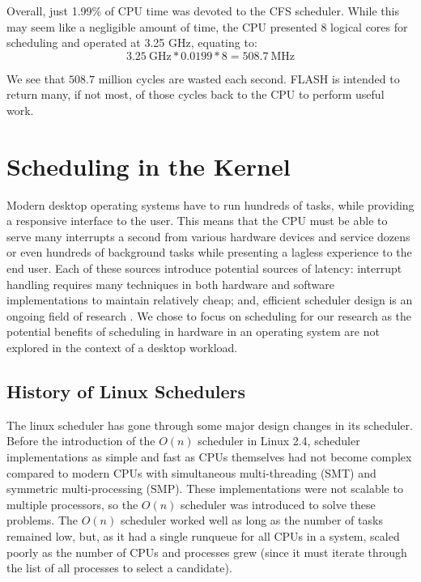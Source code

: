 \documentclass{sig-alternate-10pt}
\begin{document}
Overall, just 1.99\% of CPU time was devoted to the CFS scheduler. While this may seem like a negligible amount of time, the CPU presented 8 logical cores for scheduling and operated at 3.25 GHz, equating to:
\begin{equation*}
	3.25\ \text{GHz}*0.0199*8 = 508.7\ \text{MHz}
\end{equation*}

We see that $508.7$ million cycles are wasted each second. FLASH is intended
to return many, if not most, of those cycles back to the CPU to perform
useful work.

\section{Scheduling in the Kernel}
\label{sec:sched_in_kernel}
Modern desktop operating systems have to run hundreds of tasks, while providing a responsive interface to the user. This means that the CPU must be able to serve many interrupts a second from various hardware devices and service dozens or even hundreds of background tasks while presenting a lagless experience to the end user. Each of these sources introduce potential sources of latency: interrupt handling \cite{regehr2007safe} requires many techniques in both hardware and software implementations to maintain relatively cheap; and, efficient scheduler design is an ongoing field of research \cite{wong2008cfs, park2008hardware, morton2004hardware}. We chose to focus on scheduling for our research as the potential benefits of scheduling in hardware in an operating system are not explored in the context of a desktop workload.

\subsection{History of Linux Schedulers}
The linux scheduler has gone through some major design changes in its scheduler. Before the introduction of the $ O(n) $ scheduler in Linux 2.4, scheduler implementations as simple and fast as CPUs themselves had not become complex compared to modern CPUs with simultaneous multi-threading (SMT) and symmetric multi-processing (SMP). These implementations were not scalable to multiple processors, so the $ O(n) $ scheduler was introduced to solve these problems. The $ O(n) $ scheduler worked well as long as the number of tasks remained low, but, as it had a single runqueue for all CPUs in a system, scaled poorly as the number of CPUs and processes grew (since it must iterate through the list of all processes to select a candidate).
\end{document}
